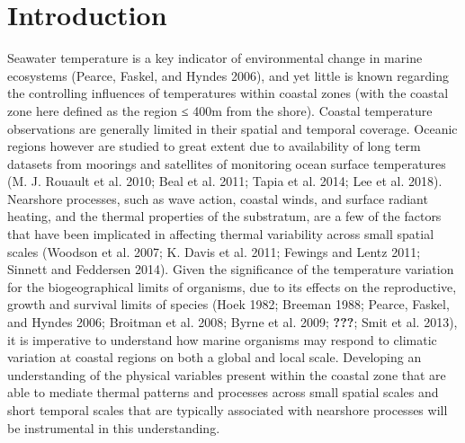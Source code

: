 \documentclass[12pt,A4paper,]{article}
\begin{document}
\newpage

\section{Introduction}\label{introduction}

Seawater temperature is a key indicator of environmental change in
marine ecosystems (Pearce, Faskel, and Hyndes 2006), and yet little is
known regarding the controlling influences of temperatures within
coastal zones (with the coastal zone here defined as the region ≤ 400m
from the shore). Coastal temperature observations are generally limited
in their spatial and temporal coverage. Oceanic regions however are
studied to great extent due to availability of long term datasets from
moorings and satellites of monitoring ocean surface temperatures (M. J.
Rouault et al. 2010; Beal et al. 2011; Tapia et al. 2014; Lee et al.
2018). Nearshore processes, such as wave action, coastal winds, and
surface radiant heating, and the thermal properties of the substratum,
are a few of the factors that have been implicated in affecting thermal
variability across small spatial scales (Woodson et al. 2007; K. Davis
et al. 2011; Fewings and Lentz 2011; Sinnett and Feddersen 2014). Given
the significance of the temperature variation for the biogeographical
limits of organisms, due to its effects on the reproductive, growth and
survival limits of species (Hoek 1982; Breeman 1988; Pearce, Faskel, and
Hyndes 2006; Broitman et al. 2008; Byrne et al. 2009; {\textbf{???}};
Smit et al. 2013), it is imperative to understand how marine organisms
may respond to climatic variation at coastal regions on both a global
and local scale. Developing an understanding of the physical variables
present within the coastal zone that are able to mediate thermal
patterns and processes across small spatial scales and short temporal
scales that are typically associated with nearshore processes will be
instrumental in this understanding.
\end{document}
